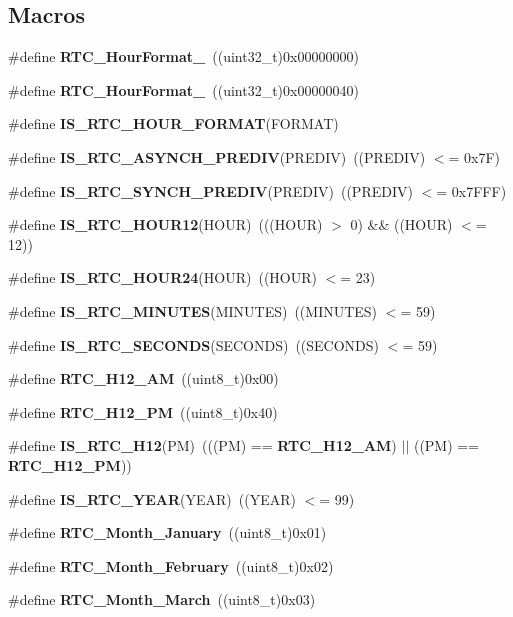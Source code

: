 \subsection*{Macros}
\begin{DoxyCompactItemize}
\item 
\#define \textbf{ R\+T\+C\+\_\+\+Hour\+Format\+\_}~((uint32\+\_\+t)0x00000000)
\item 
\#define \textbf{ R\+T\+C\+\_\+\+Hour\+Format\+\_}~((uint32\+\_\+t)0x00000040)
\item 
\#define \textbf{ I\+S\+\_\+\+R\+T\+C\+\_\+\+H\+O\+U\+R\+\_\+\+F\+O\+R\+M\+AT}(F\+O\+R\+M\+AT)
\item 
\#define \textbf{ I\+S\+\_\+\+R\+T\+C\+\_\+\+A\+S\+Y\+N\+C\+H\+\_\+\+P\+R\+E\+D\+IV}(P\+R\+E\+D\+IV)~((P\+R\+E\+D\+IV) $<$= 0x7\+F)
\item 
\#define \textbf{ I\+S\+\_\+\+R\+T\+C\+\_\+\+S\+Y\+N\+C\+H\+\_\+\+P\+R\+E\+D\+IV}(P\+R\+E\+D\+IV)~((P\+R\+E\+D\+IV) $<$= 0x7\+F\+F\+F)
\item 
\#define \textbf{ I\+S\+\_\+\+R\+T\+C\+\_\+\+H\+O\+U\+R12}(H\+O\+UR)~(((H\+O\+UR) $>$ 0) \&\& ((H\+O\+UR) $<$= 12))
\item 
\#define \textbf{ I\+S\+\_\+\+R\+T\+C\+\_\+\+H\+O\+U\+R24}(H\+O\+UR)~((H\+O\+UR) $<$= 23)
\item 
\#define \textbf{ I\+S\+\_\+\+R\+T\+C\+\_\+\+M\+I\+N\+U\+T\+ES}(M\+I\+N\+U\+T\+ES)~((M\+I\+N\+U\+T\+ES) $<$= 59)
\item 
\#define \textbf{ I\+S\+\_\+\+R\+T\+C\+\_\+\+S\+E\+C\+O\+N\+DS}(S\+E\+C\+O\+N\+DS)~((S\+E\+C\+O\+N\+DS) $<$= 59)
\item 
\#define \textbf{ R\+T\+C\+\_\+\+H12\+\_\+\+AM}~((uint8\+\_\+t)0x00)
\item 
\#define \textbf{ R\+T\+C\+\_\+\+H12\+\_\+\+PM}~((uint8\+\_\+t)0x40)
\item 
\#define \textbf{ I\+S\+\_\+\+R\+T\+C\+\_\+\+H12}(PM)~(((PM) == \textbf{ R\+T\+C\+\_\+\+H12\+\_\+\+AM}) $\vert$$\vert$ ((PM) == \textbf{ R\+T\+C\+\_\+\+H12\+\_\+\+PM}))
\item 
\#define \textbf{ I\+S\+\_\+\+R\+T\+C\+\_\+\+Y\+E\+AR}(Y\+E\+AR)~((Y\+E\+AR) $<$= 99)
\item 
\#define \textbf{ R\+T\+C\+\_\+\+Month\+\_\+\+January}~((uint8\+\_\+t)0x01)
\item 
\#define \textbf{ R\+T\+C\+\_\+\+Month\+\_\+\+February}~((uint8\+\_\+t)0x02)
\item 
\#define \textbf{ R\+T\+C\+\_\+\+Month\+\_\+\+March}~((uint8\+\_\+t)0x03)
\item 
$$
\end{DoxyCompactItemize}
